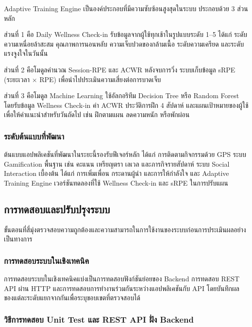 Adaptive Training Engine เป็นองค์ประกอบที่มีความซับซ้อนสูงสุดในระบบ ประกอบด้วย 3 ส่วนหลัก

ส่วนที่ 1 คือ Daily Wellness Check-in รับข้อมูลจากผู้ใช้ทุกเช้าในรูปแบบระดับ 1--5 ได้แก่ ระดับความเหนื่อยล้าสะสม คุณภาพการนอนหลับ ความเจ็บปวดของกล้ามเนื้อ ระดับความเครียด และระดับแรงจูงใจในวันนั้น

ส่วนที่ 2 คือโมดูลคำนวณ Session-RPE และ ACWR หลังจบการวิ่ง ระบบเก็บข้อมูล sRPE (ระยะเวลา $\times$ RPE) เพื่อนำไปประเมินความเสี่ยงต่อการบาดเจ็บ

ส่วนที่ 3 คือโมดูล Machine Learning ใช้อัลกอริทึม Decision Tree หรือ Random Forest โดยรับข้อมูล Wellness Check-in ค่า ACWR ประวัติการฝึก 4 สัปดาห์ และแผนเป้าหมายของผู้ใช้ เพื่อให้คำแนะนำสำหรับวันถัดไป เช่น ฝึกตามแผน ลดความหนัก หรือพักผ่อน

\subsubsection{ระดับต้นแบบที่พัฒนา}

ต้นแบบแอปพลิเคชันที่พัฒนาในระยะนี้รองรับฟีเจอร์หลัก ได้แก่ การติดตามกิจกรรมด้วย GPS ระบบ Gamification พื้นฐาน เช่น คะแนน เหรียญตรา เลเวล และภารกิจรายสัปดาห์ ระบบ Social Interaction เบื้องต้น ได้แก่ การเพิ่มเพื่อน กระดานผู้นำ และการให้กำลังใจ และ Adaptive Training Engine เวอร์ชันทดลองที่ใช้ Wellness Check-in และ sRPE ในการปรับแผน

\subsection{การทดสอบและปรับปรุงระบบ}

ขั้นตอนที่สี่มุ่งตรวจสอบความถูกต้องและความสามารถในการใช้งานของระบบก่อนการประเมินผลอย่างเป็นทางการ

\subsubsection{การทดสอบระบบในเชิงเทคนิค}

การทดสอบระบบในเชิงเทคนิคแบ่งเป็นการทดสอบฟังก์ชันย่อยของ Backend การทดสอบ REST API ผ่าน HTTP และการทดสอบการทำงานร่วมกันระหว่างแอปพลิเคชันกับ API โดยบันทึกผลของแต่ละระดับแยกจากกันเพื่อระบุขอบเขตที่ตรวจสอบได้

\subsubsection{วิธีการทดสอบ Unit Test และ REST API ฝั่ง Backend}
\label{sec:backend-api-test-method}

